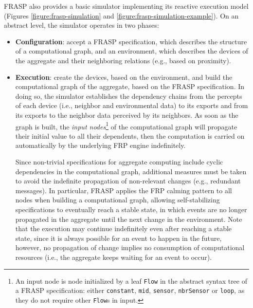 FRASP also provides a basic simulator implementing its reactive execution model
(Figures \ref{figure:frasp-simulation} and
\ref{figure:frasp-simulation-example}). On an abstract level, the simulator
operates in two phases:
\begin{itemize}
  \item \textbf{Configuration}: accept a FRASP specification, which describes
        the structure of a computational graph, and an environment, which
        describes the devices of the aggregate and their neighboring relations
        (e.g., based on proximity).
  \item \textbf{Execution}: create the devices, based on the environment, and
        build the computational graph of the aggregate, based on the FRASP
        specification. In doing so, the simulator establishes the dependency
        chains from the percepts of each device (i.e., neighbor and
        environmental data) to its exports and from its exports to the
        neighbor data perceived by its neighbors. As soon as the graph is
        built, the \textit{input nodes}\footnote{
          An input node is node initialized by a leaf \texttt{Flow} in the
          abstract syntax tree of a FRASP specification: either
          \texttt{constant}, \texttt{mid}, \texttt{sensor}, \texttt{nbrSensor}
          or \texttt{loop}, as they do not require other \texttt{Flow}s in
          input.
        } of the computational graph will propagate their initial value to all
        their dependents, then the computation is carried on automatically by
        the underlying \ac{FRP} engine indefinitely.

        Since non-trivial specifications for aggregate computing include cyclic
        dependencies in the computational graph, additional measures must be
        taken to avoid the indefinite propagation of non-relevant changes
        (e.g., redundant messages). In particular, FRASP applies the FRP
        calming pattern to all nodes when building a computational graph,
        allowing self-stabilizing specifications to eventually reach a stable
        state, in which events are no longer propagated in the aggregate until
        the next change in the environment. Note that the execution may
        continue indefinitely even after reaching a stable state, since it is
        always possible for an event to happen in the future, however, no
        propagation of change implies no consumption of computational resources
        (i.e., the aggregate keeps waiting for an event to occur).
\end{itemize}

